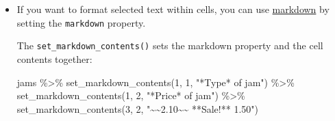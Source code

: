 \documentclass[
]{article}
\newenvironment{Shaded}{\begin{snugshade}}{\end{snugshade}}
\newcommand{\DecValTok}[1]{\textcolor[rgb]{0.00,0.00,0.81}{#1}}
\newcommand{\FunctionTok}[1]{\textcolor[rgb]{0.00,0.00,0.00}{#1}}
\newcommand{\NormalTok}[1]{#1}
\newcommand{\SpecialCharTok}[1]{\textcolor[rgb]{0.00,0.00,0.00}{#1}}
\newcommand{\StringTok}[1]{\textcolor[rgb]{0.31,0.60,0.02}{#1}}
\begin{document}
\begin{itemize}
\begin{table}[ht]
\begin{centerbox}
\begin{threeparttable}
\begin{tabularx}{0.4\textwidth}{p{} p{}}
   &
   \tabularnewline[-0.5pt]


  \hhline{}
  \end{tabularx}
  \end{threeparttable}\par\end{centerbox}

  \end{table}

  \FloatBarrier

  This uses another huxtable-specific shortcut: \texttt{evens} specifies
  even-numbered rows or columns. (And \texttt{odds} specifies
  odd-numbered rows or columns.)
\item
  If you want to format selected text within cells, you can use
  \href{https://commonmark.org/help/}{markdown} by setting the
  \texttt{markdown} property.

  The \texttt{set\_markdown\_contents()} sets the markdown property and
  the cell contents together:

\begin{Shaded}
\begin{Highlighting}[]
\NormalTok{jams }\SpecialCharTok{\%\textgreater{}\%} 
      \FunctionTok{set\_markdown\_contents}\NormalTok{(}\DecValTok{1}\NormalTok{, }\DecValTok{1}\NormalTok{, }\StringTok{"*Type* of jam"}\NormalTok{) }\SpecialCharTok{\%\textgreater{}\%} 
      \FunctionTok{set\_markdown\_contents}\NormalTok{(}\DecValTok{1}\NormalTok{, }\DecValTok{2}\NormalTok{, }\StringTok{"*Price* of jam"}\NormalTok{) }\SpecialCharTok{\%\textgreater{}\%} 
      \FunctionTok{set\_markdown\_contents}\NormalTok{(}\DecValTok{3}\NormalTok{, }\DecValTok{2}\NormalTok{, }\StringTok{"\textasciitilde{}\textasciitilde{}2.10\textasciitilde{}\textasciitilde{} **Sale!** 1.50"}\NormalTok{)}
\end{Highlighting}
\end{Shaded}

    \providecommand{\huxb}[2]{\arrayrulecolor[RGB]{#1}\global\arrayrulewidth=#2pt}
    \providecommand{\huxvb}[2]{\color[RGB]{#1}\vrule width #2pt}
    \providecommand{\huxtpad}[1]{\rule{0pt}{#1}}
    \providecommand{\huxbpad}[1]{\rule[-#1]{0pt}{#1}}


\end{itemize}
\end{document}
